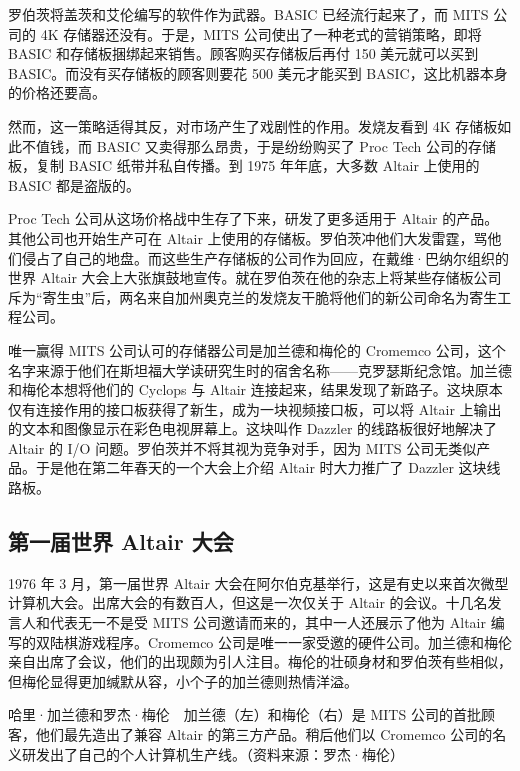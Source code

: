 \documentclass[12pt,UTF8]{ctexbook}
\begin{document}
罗伯茨将盖茨和艾伦编写的软件作为武器。BASIC 已经流行起来了，而 MITS 公司的 4K 存储器还没有。于是，MITS 公司使出了一种老式的营销策略，即将 BASIC 和存储板捆绑起来销售。顾客购买存储板后再付 150 美元就可以买到 BASIC。而没有买存储板的顾客则要花 500 美元才能买到 BASIC，这比机器本身的价格还要高。

然而，这一策略适得其反，对市场产生了戏剧性的作用。发烧友看到 4K 存储板如此不值钱，而 BASIC 又卖得那么昂贵，于是纷纷购买了 Proc Tech 公司的存储板，复制 BASIC 纸带并私自传播。到 1975 年年底，大多数 Altair 上使用的 BASIC 都是盗版的。

Proc Tech 公司从这场价格战中生存了下来，研发了更多适用于 Altair 的产品。其他公司也开始生产可在 Altair 上使用的存储板。罗伯茨冲他们大发雷霆，骂他们侵占了自己的地盘。而这些生产存储板的公司作为回应，在戴维·巴纳尔组织的世界 Altair 大会上大张旗鼓地宣传。就在罗伯茨在他的杂志上将某些存储板公司斥为“寄生虫”后，两名来自加州奥克兰的发烧友干脆将他们的新公司命名为寄生工程公司。

唯一赢得 MITS 公司认可的存储器公司是加兰德和梅伦的 Cromemco 公司，这个名字来源于他们在斯坦福大学读研究生时的宿舍名称——克罗瑟斯纪念馆。加兰德和梅伦本想将他们的 Cyclops 与 Altair 连接起来，结果发现了新路子。这块原本仅有连接作用的接口板获得了新生，成为一块视频接口板，可以将 Altair 上输出的文本和图像显示在彩色电视屏幕上。这块叫作 Dazzler 的线路板很好地解决了 Altair 的 I/O 问题。罗伯茨并不将其视为竞争对手，因为 MITS 公司无类似产品。于是他在第二年春天的一个大会上介绍 Altair 时大力推广了 Dazzler 这块线路板。





\subsection{第一届世界 Altair 大会}


1976 年 3 月，第一届世界 Altair 大会在阿尔伯克基举行，这是有史以来首次微型计算机大会。出席大会的有数百人，但这是一次仅关于 Altair 的会议。十几名发言人和代表无一不是受 MITS 公司邀请而来的，其中一人还展示了他为 Altair 编写的双陆棋游戏程序。Cromemco 公司是唯一一家受邀的硬件公司。加兰德和梅伦亲自出席了会议，他们的出现颇为引人注目。梅伦的壮硕身材和罗伯茨有些相似，但梅伦显得更加缄默从容，小个子的加兰德则热情洋溢。



哈里·加兰德和罗杰·梅伦　加兰德（左）和梅伦（右）是 MITS 公司的首批顾客，他们最先造出了兼容 Altair 的第三方产品。稍后他们以 Cromemco 公司的名义研发出了自己的个人计算机生产线。（资料来源：罗杰·梅伦）
\end{document}
